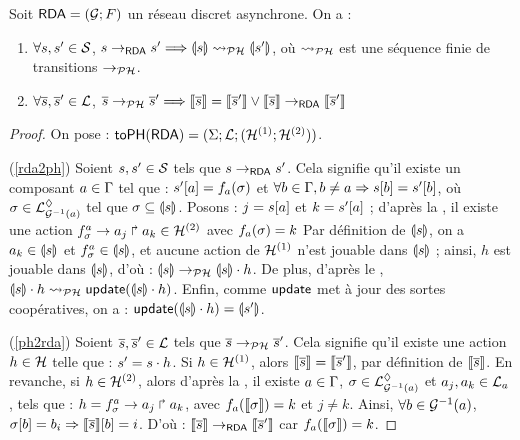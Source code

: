 \begin{theorem}[$\RDA \approx \rdatoph$]
  Soit $\mathsf{RDA} = (\mathcal{G}; F)$ un réseau discret asynchrone.
  On a :
  \begin{enumerate}
    \item \label{rda2ph} $\forall s, s' \in \mathcal{S}$,
      $s \rightarrow_{\mathsf{RDA}} s' \Longrightarrow \llparenthesis s\rrparenthesis \rightsquigarrow_{\mathcal{PH}} \llparenthesis s'\rrparenthesis$,
      où $\rightsquigarrow_{\mathcal{PH}}$ est une séquence finie de transitions $\rightarrow_{\mathcal{PH}}$.
    \item \label{ph2rda} $\forall \overline{s}, \overline{s}' \in \mathcal{L}$,
      $\overline{s} \rightarrow_{\mathcal{PH}} \overline{s}' \Longrightarrow
        \llbracket\overline{s}\rrbracket = \llbracket\overline{s}'\rrbracket \vee \llbracket\overline{s}\rrbracket \rightarrow_{\mathsf{RDA}} \llbracket\overline{s}'\rrbracket$
  \end{enumerate}
\end{theorem}

\begin{proof}
  On pose : $\mathsf{toPH}(\mathsf{RDA}) = (\Sigma; \mathcal{L}; (\mathcal{H}^{(1)}; \mathcal{H}^{(2)}))$.
  
  (\ref{rda2ph}) Soient $s, s' \in \mathcal{S}$ tels que $s \rightarrow_{\mathsf{RDA}} s'$.
    Cela signifie qu'il existe un composant $a \in \mathrm{\Gamma}$ tel que :
    ${s'[a]} = f_a(\sigma)$ et
    $\forall b \in \mathrm{\Gamma}, b \neq a \Rightarrow {s[b]} = {s'[b]}$,
    où $\sigma \in \mathcal{L}^\lozenge_{\mathcal{G}^{-1}(a)}$ tel que $\sigma \subseteq \llparenthesis s\rrparenthesis$.
    Posons : $j = {s[a]}$ et $k = {s'[a]}$ ;
    d'après la , il existe une action
    $f^a_\sigma\rightarrow a_j\Rsh a_k \in \mathcal{H}^{(2)}$
    avec $f_a(\sigma) = k$
    Par définition de $\llparenthesis s\rrparenthesis$, on a $a_k \in \llparenthesis s\rrparenthesis$
    et $f^a_\sigma \in \llparenthesis s\rrparenthesis$,
    et aucune action de $\mathcal{H}^{(1)}$ n'est jouable dans $\llparenthesis s\rrparenthesis$ ;
    ainsi, $h$ est jouable dans $\llparenthesis s\rrparenthesis$, d'où : $\llparenthesis s\rrparenthesis \rightarrow_{\mathcal{PH}} \llparenthesis s\rrparenthesis \cdot h$.
    De plus, d'après le ,
    $\llparenthesis s\rrparenthesis \cdot h \rightsquigarrow_{\mathcal{PH}} \mathsf{update}(\llparenthesis s\rrparenthesis \cdot h)$.
    Enfin, comme $\mathsf{update}$ met à jour des sortes coopératives, on a :
    $\mathsf{update}(\llparenthesis s\rrparenthesis \cdot h) = \llparenthesis s'\rrparenthesis$.
  
  (\ref{ph2rda}) Soient $\overline{s}, \overline{s}' \in \mathcal{L}$ tels que $\overline{s} \rightarrow_{\mathcal{PH}} \overline{s}'$.
    Cela signifie qu'il existe une action $h \in \mathcal{H}$ telle que : $s' = s \cdot h$.
    Si $h \in \mathcal{H}^{(1)}$, alors $\llbracket\overline{s}\rrbracket = \llbracket\overline{s}'\rrbracket$, par définition
    de $\llbracket\overline{s}\rrbracket$.
    En revanche, si $h \in \mathcal{H}^{(2)}$, alors d'après la ,
    il existe $a \in \mathrm{\Gamma}$, $\sigma \in \mathcal{L}^\lozenge_{\mathcal{G}^{-1}(a)}$
    et $a_j, a_k \in \mathcal{L}_{a}$, tels que :
    $h = f^a_\sigma\rightarrow a_j\Rsh a_{k}$, avec $f_a(\llbracket\sigma\rrbracket) = k$ et $j \neq k$.
    Ainsi, $\forall b \in \mathcal{G}^{-1}(a)$,
    ${\sigma[b]} = b_i \Rightarrow {\llbracket\overline{s}\rrbracket[b]} = i$.
    D'où : $\llbracket\overline{s}\rrbracket \rightarrow_{\mathsf{RDA}} \llbracket\overline{s}'\rrbracket$
    car $f_a(\llbracket\sigma\rrbracket) = k$.
\end{proof}
